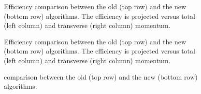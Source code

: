 \begin{figure}[h]
  \centering
  \begin{subfigure}{0.5\textwidth}
    \scalebox{.6}{}
    \caption{}
    \label{mvTTm_eff_p}
  \end{subfigure}%
  \hfill%
  \begin{subfigure}{0.5\textwidth}
    \scalebox{.6}{}
    \caption{}
    \label{mvm_eff_p}
  \end{subfigure}
  \caption{Efficiency comparison between the old \mvm (top row) and the new \mvTTm (bottom row) algorithms.
 The efficiency is projected versus total (left column) and transverse (right column) momentum.  }
 \label{mvm_eff_p_comp}
\end{figure}

\begin{figure}[h]
  \centering
  \begin{subfigure}{0.5\textwidth}
    \scalebox{.6}{}
    \caption{}
    \label{mvTTm_eff_p}
  \end{subfigure}%
  \hfill%
  \begin{subfigure}{0.5\textwidth}
    \scalebox{.6}{}
    \caption{}
    \label{mvm_eff_p}
  \end{subfigure}
  \caption{Efficiency comparison between the old \mvm (top row) and the new \mvTTm (bottom row) algorithms.
 The efficiency is projected versus total (left column) and transverse (right column) momentum.  }
 \label{mvm_eff_p_comp}
\end{figure}

\begin{figure}[h]
  \centering
  \begin{subfigure}{0.5\textwidth}
    \scalebox{.6}{}
    \caption{}
    \label{mvTTm_chi2}
  \end{subfigure}%
  \hfill%
  \begin{subfigure}{0.5\textwidth}
    \scalebox{.6}{}
    \caption{}
    \label{mvm_chi2}
  \end{subfigure}
  \caption{\chisq comparison between the old \mvm (top row) and the new \mvTTm (bottom row) algorithms.}
 \label{mvm_chi2_comp}
\end{figure}

